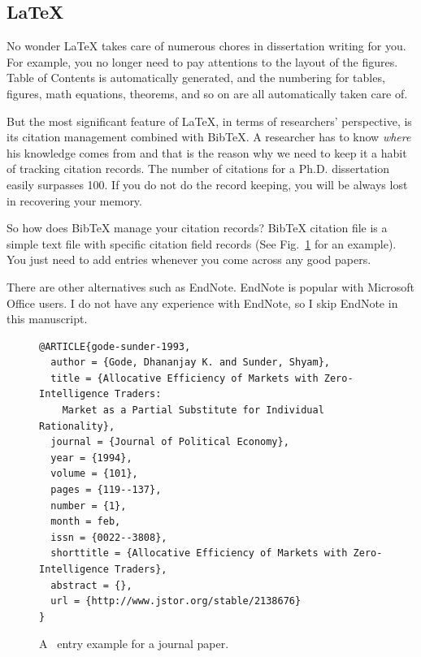 \documentclass[11pt]{article}
\begin{document}
\subsection{LaTeX}
No wonder LaTeX takes care of numerous chores in dissertation writing for you.
For example, you no longer need to pay attentions to the layout of the
figures.  Table of Contents is automatically generated, and the numbering for
tables, figures, math equations, theorems, and so on are all automatically
taken care of. 

But the most significant feature of LaTeX, in terms of researchers'
perspective, is its citation management combined with BibTeX. A researcher has
to know \emph{where} his knowledge comes from and that is the reason why we
need to keep it a habit of tracking citation records.  The number of citations
for a Ph.D. dissertation easily surpasses 100.  If you do not do the record
keeping, you will be always lost in recovering your memory.

So how does BibTeX manage your citation records? BibTeX citation file is a
simple text file with specific citation field records (See
Fig.~\ref{fig:bibtex-example} for an example). You just need to add entries
whenever you come across any good papers. 

There are other alternatives such as EndNote. EndNote is popular with
Microsoft Office users. I do not have any experience with EndNote, so I skip
EndNote in this manuscript. 

\begin{figure}[ht]
    \begin{center}
    \begin{footnotesize}
\begin{verbatim}
@ARTICLE{gode-sunder-1993,
  author = {Gode, Dhananjay K. and Sunder, Shyam},
  title = {Allocative Efficiency of Markets with Zero-Intelligence Traders:
    Market as a Partial Substitute for Individual Rationality},
  journal = {Journal of Political Economy},
  year = {1994},
  volume = {101},
  pages = {119--137}, 
  number = {1},
  month = feb,
  issn = {0022--3808},
  shorttitle = {Allocative Efficiency of Markets with Zero-Intelligence Traders},
  abstract = {},
  url = {http://www.jstor.org/stable/2138676}
}
\end{verbatim}
    \end{footnotesize}
    \end{center}
    \caption{A \BibTeX~entry example for a journal paper.}
    \label{fig:bibtex-example}
\end{figure}
\end{document}
